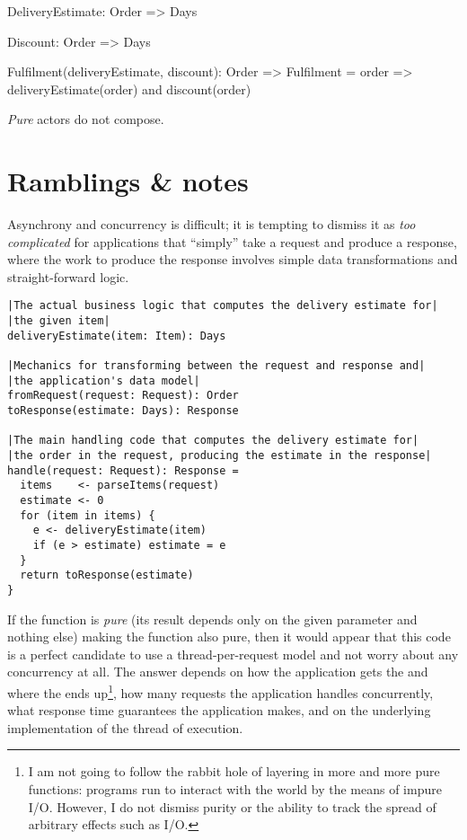 DeliveryEstimate: Order => Days

Discount: Order => Days

Fulfilment(deliveryEstimate, discount): Order => Fulfilment =
  order =>
    deliveryEstimate(order) and discount(order)

\emph{Pure} actors do not compose. 


\section{Ramblings \& notes}
Asynchrony and concurrency is difficult; it is tempting to dismiss it as \emph{too complicated} for applications that ``simply'' take a request and produce a response, where the work to produce the response involves simple data transformations and straight-forward logic.

\begin{lstlisting}[caption={Delivery estimate}, label={code:delivery-estimate}, language=Pseudo, escapechar=|]
|The actual business logic that computes the delivery estimate for|
|the given item|
deliveryEstimate(item: Item): Days

|Mechanics for transforming between the request and response and|
|the application's data model|
fromRequest(request: Request): Order
toResponse(estimate: Days): Response

|The main handling code that computes the delivery estimate for|
|the order in the request, producing the estimate in the response|
handle(request: Request): Response = 
  items    <- parseItems(request)
  estimate <- 0
  for (item in items) {
    e <- deliveryEstimate(item)
    if (e > estimate) estimate = e
  }
  return toResponse(estimate)
}
\end{lstlisting}

If the  function is \emph{pure} (its result depends only on the given parameter and nothing else) making the  function also pure, then it would appear that this code is a perfect candidate to use a thread-per-request model and not worry about any concurrency at all. The answer depends on how the application gets the  and where the  ends up\footnote{I am not going to follow the rabbit hole of layering in more and more pure functions: programs run to interact with the world by the means of impure I/O. However, I do not dismiss purity or the ability to track the spread of arbitrary effects such as I/O.}, how many requests the application handles concurrently, what response time guarantees the application makes, and on the underlying implementation of the thread of execution.


